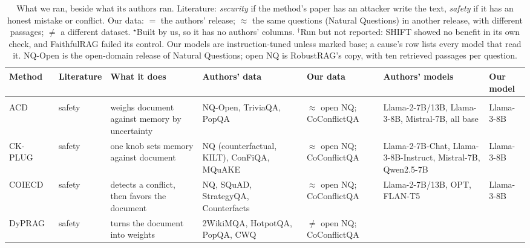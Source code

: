 \begin{table}[t]
\centering
\caption{What we ran, beside what its authors ran. Literature: \emph{security}
if the method's paper has an attacker write the text, \emph{safety} if it
has an honest mistake or conflict. Our data: $=$ the authors' release; $\approx$ the same questions
(Natural Questions) in another release, with different passages; $\neq$ a
different dataset. $^\star$Built by us, so it has no authors' columns.
$^\dagger$Run but not reported: SHIFT showed no benefit in its own check, and
FaithfulRAG failed its control. Our models are instruction-tuned unless
marked base; a cause's row lists every model that read it. NQ-Open is
the open-domain release of Natural Questions; open NQ is RobustRAG's copy,
with ten retrieved passages per question.}
\label{tab:provenance}
\scriptsize
\setlength{\tabcolsep}{3pt}
\renewcommand{\arraystretch}{1.0}
\begin{tabular}{@{}>{\raggedright\arraybackslash}p{}
l
>{\raggedright\arraybackslash}p{}
>{\raggedright\arraybackslash}p{}
>{\raggedright\arraybackslash}p{}
>{\raggedright\arraybackslash}p{}
>{\raggedright\arraybackslash}p{}@{}}
\toprule
\textbf{Method} & \textbf{Literature} & \textbf{What it does} & \textbf{Authors' data} &
\textbf{Our data} & \textbf{Authors' models} & \textbf{Our model} \\
\midrule
\multicolumn{7}{@{}l}{\emph{Fixes}} \\
ACD~\cite{kim-2024-adaptive} & safety & weighs document against memory by uncertainty &
  NQ-Open, TriviaQA, PopQA & $\approx$ open NQ; CoConflictQA &
  Llama-2-7B/13B, Llama-3-8B, Mistral-7B, all base & Llama-3-8B \\
CK-PLUG~\cite{bi-2025-parameters} & safety & one knob sets memory against document &
  NQ (counterfactual, KILT), ConFiQA, MQuAKE & $\approx$ open NQ; CoConflictQA &
  Llama-2-7B-Chat, Llama-3-8B-Instruct, Mistral-7B, Qwen2.5-7B & Llama-3-8B \\
COIECD~\cite{yuan-2024-discerning} & safety & detects a conflict, then favors the document &
  NQ, SQuAD, StrategyQA, Counterfacts & $\approx$ open NQ; CoConflictQA &
  Llama-2-7B/13B, OPT, FLAN-T5 & Llama-3-8B \\
DyPRAG~\cite{tan-2025-dynamic} & safety & turns the document into weights &
  2WikiMQA, HotpotQA, PopQA, CWQ & $\neq$ open NQ; CoConflictQA &

\end{tabular}
\end{table}
